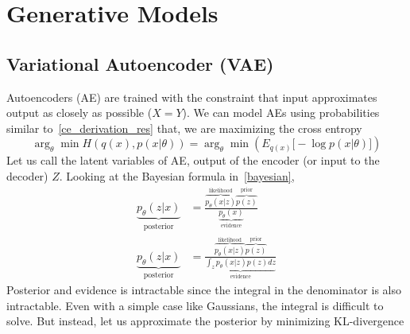 \documentclass{book}
\numberwithin{equation}{subsection}
\begin{document}
\chapter{Generative Models}
\section{Variational Autoencoder (VAE)}
Autoencoders (AE) are trained with the constraint that input approximates output as closely as possible ($X=Y$). We can model AEs using probabilities similar to~\ref{ce_derivation_res} that, we are maximizing the cross entropy
\begin{equation}
    \arg_\theta \min H(q(x), p(x|\theta)) = \arg_\theta \min \left( E_{q(x)}\Big[-\log p(x|\theta)\Big]\right)
\end{equation}
Let us call the latent variables of AE, output of the encoder (or input to the decoder) $Z$. Looking at the Bayesian formula in~\ref{bayesian},
\begin{align}
    \underbrace{p_\theta(z|x)}_{\text{posterior}} &= \frac{\overbrace{p_\theta(x|z)}^\text{likelihood}\overbrace{p(z)}^\text{prior}}{\underbrace{p_\theta(x)}_\text{evidence}}\\
    \underbrace{p_\theta(z|x)}_{\text{posterior}} &= \frac{\overbrace{p_\theta(x|z)}^\text{likelihood}\overbrace{p(z)}^\text{prior}}{\underbrace{\int_z p_\theta(x|z)p(z)dz}_\text{evidence}}
\end{align}
Posterior and evidence is intractable since the integral in the denominator is also intractable. Even with a simple case like Gaussians, the integral is difficult to solve. But instead, let us approximate the posterior by minimizing KL-divergence
\end{document}

